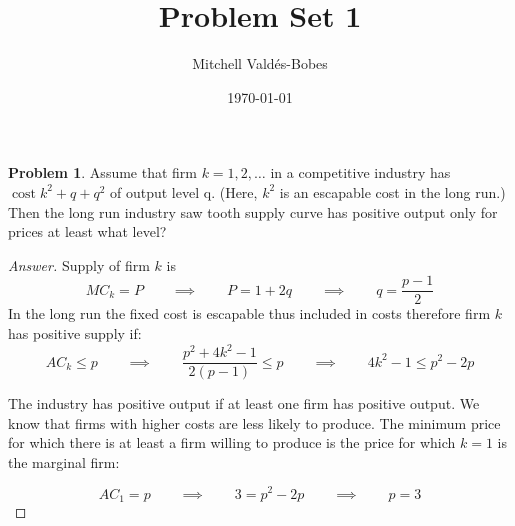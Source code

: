 \documentclass[12pt]{article}
\title{Problem Set 1}
\author{Mitchell Valdés-Bobes}
\date{\today}
\theoremstyle{definition}
\newtheorem{problem}{Problem}
\newcommand{\qiq}{\qquad \implies \qquad}
\begin{document}
\maketitle

\begin{problem}
Assume that firm $k=1,2, \ldots$ in a competitive industry has $\operatorname{cost} k^{2}+q+q^{2}$ of output level
q. (Here, $k^{2}$ is an escapable cost in the long run.) Then the long run industry saw tooth supply curve has positive output only for prices at least what level?
\end{problem}

\begin{proof}[Answer]
Supply of firm $k$ is 
$$MC_k = P \qiq P = 1+2q \qiq q = \frac{p-1}{2}$$
In the long run the fixed cost is escapable thus included in costs therefore firm $k$ has positive supply if:
$$AC_k \leq p \qiq \frac{p^2+4k^2-1}{2(p-1)}\leq p \qiq 4k^2-1\leq p^2-2p$$

The industry has positive output if at least one firm has positive output. We know that firms with higher costs are less likely to produce. The minimum price for which there is at least a firm willing to produce is the price for which $k=1$ is the marginal firm:

$$AC_1 = p \qiq 3 = p^2-2p \qiq \boxed{p=3}$$

\end{proof}
\end{document}
